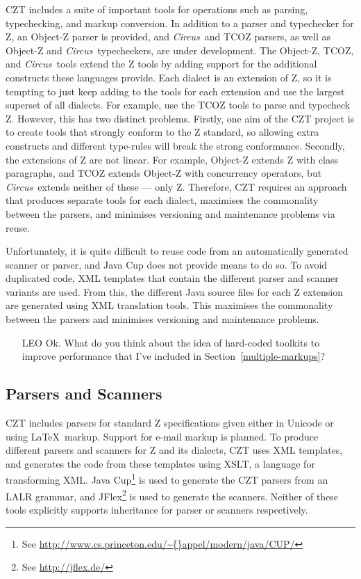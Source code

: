 \documentclass{llncs}
\newcommand{\Circus}{{\sf\slshape Circus}}
\begin{document}
  CZT includes a suite of important tools for operations such as parsing,
  typechecking, and markup conversion. In addition to a parser and
  typechecker for Z, an Object-Z parser is provided, and \Circus\ and TCOZ
  parsers, as well as Object-Z and \Circus\ typecheckers, are under development.
  The Object-Z, TCOZ, and \Circus\ tools extend the Z tools by adding
  support for the additional constructs these languages provide.  Each
  dialect is an extension of Z, so it is tempting to just keep adding
  to the tools for each extension and use the largest superset of all
  dialects. For example, use the TCOZ tools to parse and typecheck
  Z. However, this has two distinct problems. Firstly, one aim of the
  CZT project is to create tools that strongly conform to the Z
  standard, so allowing extra constructs and different type-rules will
  break the strong conformance. Secondly, the extensions of Z are not
  linear. For example, Object-Z extends Z with class paragraphs, and
  TCOZ extends Object-Z with concurrency operators, but \Circus\ extends
  neither of these --- only Z. Therefore, CZT requires an approach that
  produces separate tools for each dialect, maximises the commonality
  between the parsers, and minimises versioning and maintenance
  problems via reuse.

  Unfortunately, it is quite difficult to reuse code from an
  automatically generated scanner or parser, and Java Cup does not
  provide means to do so.  To avoid duplicated code, XML templates that
  contain the different parser and scanner variants are used. From
  this, the different Java source files for each Z extension are generated
  using XML translation tools. This maximises the commonality between the
  parsers and minimises versioning and maintenance problems.

  \begin{itemize}
    \item[LEO] Ok. What do you think about the idea of hard-coded toolkits to
               improve performance that I've included in Section~\ref{multiple-markups}?
  \end{itemize}

\subsection{Parsers and Scanners}

  CZT includes parsers for standard Z specifications given either in
  Unicode or using \LaTeX\ markup.  Support for e-mail markup is
  planned. To produce different parsers and scanners for Z and its
  dialects, CZT uses XML templates, and generates the code from these
  templates using XSLT, a language for transforming XML. Java
  Cup\footnote{See
  \url{http://www.cs.princeton.edu/\~{}appel/modern/java/CUP/}} is
  used to generate the CZT parsers from an LALR grammar, and
  JFlex\footnote{See \url{http://jflex.de/}} is used to generate the
  scanners. Neither of these tools explicitly supports inheritance for
  parser or scanners respectively.
\end{document}
